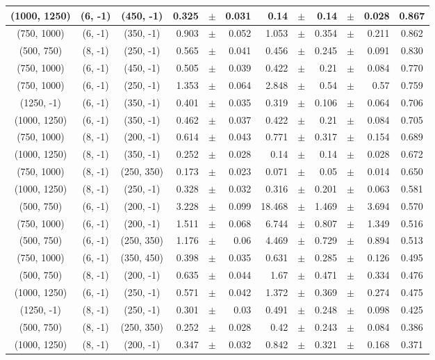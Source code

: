 \documentclass[12pt]{paper}
\begin{document}
\begin{table}[ht]
\begin{center}
{\begin{tabular}{|c|c|c|rrr|rrrrr|c|}
(1000, 1250)&(6, -1)&(450, -1)&0.325&$\pm$&0.031&0.14&$\pm$&0.14&$\pm$&0.028&0.867\\\hline
(750, 1000)&(6, -1)&(350, -1)&0.903&$\pm$&0.052&1.053&$\pm$&0.354&$\pm$&0.211&0.862\\\hline
(500, 750)&(8, -1)&(250, -1)&0.565&$\pm$&0.041&0.456&$\pm$&0.245&$\pm$&0.091&0.830\\\hline
(750, 1000)&(6, -1)&(450, -1)&0.505&$\pm$&0.039&0.422&$\pm$&0.21&$\pm$&0.084&0.770\\\hline
(750, 1000)&(6, -1)&(250, -1)&1.353&$\pm$&0.064&2.848&$\pm$&0.54&$\pm$&0.57&0.759\\\hline
(1250, -1)&(6, -1)&(350, -1)&0.401&$\pm$&0.035&0.319&$\pm$&0.106&$\pm$&0.064&0.706\\\hline
(1000, 1250)&(6, -1)&(350, -1)&0.462&$\pm$&0.037&0.422&$\pm$&0.21&$\pm$&0.084&0.705\\\hline
(750, 1000)&(8, -1)&(200, -1)&0.614&$\pm$&0.043&0.771&$\pm$&0.317&$\pm$&0.154&0.689\\\hline
(1000, 1250)&(8, -1)&(350, -1)&0.252&$\pm$&0.028&0.14&$\pm$&0.14&$\pm$&0.028&0.672\\\hline
(750, 1000)&(8, -1)&(250, 350)&0.173&$\pm$&0.023&0.071&$\pm$&0.05&$\pm$&0.014&0.650\\\hline
(1000, 1250)&(8, -1)&(250, -1)&0.328&$\pm$&0.032&0.316&$\pm$&0.201&$\pm$&0.063&0.581\\\hline
(500, 750)&(6, -1)&(200, -1)&3.228&$\pm$&0.099&18.468&$\pm$&1.469&$\pm$&3.694&0.570\\\hline
(750, 1000)&(6, -1)&(200, -1)&1.511&$\pm$&0.068&6.744&$\pm$&0.807&$\pm$&1.349&0.516\\\hline
(500, 750)&(6, -1)&(250, 350)&1.176&$\pm$&0.06&4.469&$\pm$&0.729&$\pm$&0.894&0.513\\\hline
(750, 1000)&(6, -1)&(350, 450)&0.398&$\pm$&0.035&0.631&$\pm$&0.285&$\pm$&0.126&0.495\\\hline
(500, 750)&(8, -1)&(200, -1)&0.635&$\pm$&0.044&1.67&$\pm$&0.471&$\pm$&0.334&0.476\\\hline
(1000, 1250)&(6, -1)&(250, -1)&0.571&$\pm$&0.042&1.372&$\pm$&0.369&$\pm$&0.274&0.475\\\hline
(1250, -1)&(8, -1)&(250, -1)&0.301&$\pm$&0.03&0.491&$\pm$&0.248&$\pm$&0.098&0.425\\\hline
(500, 750)&(8, -1)&(250, 350)&0.252&$\pm$&0.028&0.42&$\pm$&0.243&$\pm$&0.084&0.386\\\hline
(1000, 1250)&(8, -1)&(200, -1)&0.347&$\pm$&0.032&0.842&$\pm$&0.321&$\pm$&0.168&0.371\\\hline

\end{tabular}}
\end{center}
\end{table}
\end{document}
